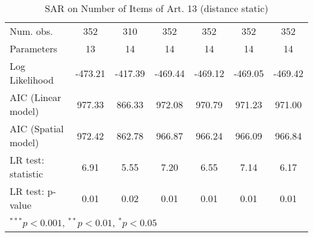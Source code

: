 \begin{table}[!h]
\begin{center}
\begin{tabular}{l c c c c c c }
\midrule
Num. obs.               & 352         & 310         & 352         & 352         & 352         & 352         \\
Parameters              & 13          & 14          & 14          & 14          & 14          & 14          \\
Log Likelihood          & -473.21     & -417.39     & -469.44     & -469.12     & -469.05     & -469.42     \\
AIC (Linear model)      & 977.33      & 866.33      & 972.08      & 970.79      & 971.23      & 971.00      \\
AIC (Spatial model)     & 972.42      & 862.78      & 966.87      & 966.24      & 966.09      & 966.84      \\
LR test: statistic      & 6.91        & 5.55        & 7.20        & 6.55        & 7.14        & 6.17        \\
LR test: p-value        & 0.01        & 0.02        & 0.01        & 0.01        & 0.01        & 0.01        \\
\bottomrule
\multicolumn{7}{l}{\scriptsize{$^{***}p<0.001$, $^{**}p<0.01$, $^*p<0.05$}}
\end{tabular}
\caption{SAR on Number of Items of Art. 13 (distance static)}
\label{table:coefficients}
\end{center}
\end{table}
